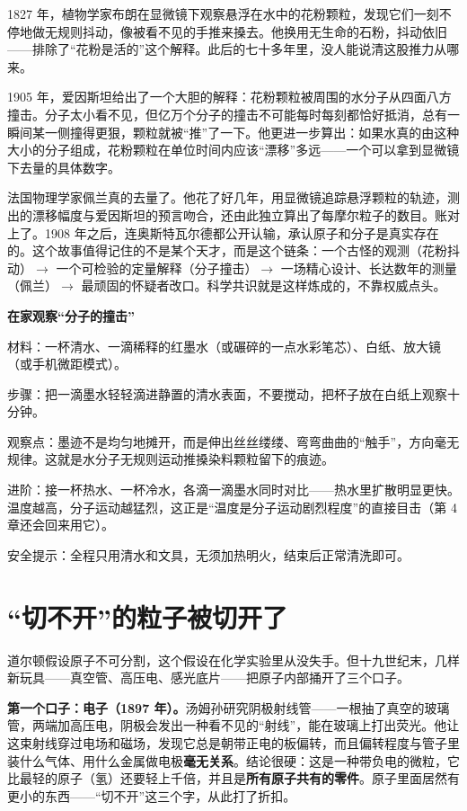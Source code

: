 \begin{zhengju}
1827 年，植物学家布朗在显微镜下观察悬浮在水中的花粉颗粒，发现它们一刻不停地做无规则抖动，像被看不见的手推来搡去。他换用无生命的石粉，抖动依旧——排除了“花粉是活的”这个解释。此后的七十多年里，没人能说清这股推力从哪来。

1905 年，爱因斯坦给出了一个大胆的解释：花粉颗粒被周围的水分子从四面八方撞击。分子太小看不见，但亿万个分子的撞击不可能每时每刻都恰好抵消，总有一瞬间某一侧撞得更狠，颗粒就被“推”了一下。他更进一步算出：如果水真的由这种大小的分子组成，花粉颗粒在单位时间内应该“漂移”多远——一个可以拿到显微镜下去量的具体数字。

法国物理学家佩兰真的去量了。他花了好几年，用显微镜追踪悬浮颗粒的轨迹，测出的漂移幅度与爱因斯坦的预言吻合，还由此独立算出了每摩尔粒子的数目。账对上了。1908 年之后，连奥斯特瓦尔德都公开认输，承认原子和分子是真实存在的。这个故事值得记住的不是某个天才，而是这个链条：一个古怪的观测（花粉抖动）$\rightarrow$ 一个可检验的定量解释（分子撞击）$\rightarrow$ 一场精心设计、长达数年的测量（佩兰）$\rightarrow$ 最顽固的怀疑者改口。科学共识就是这样炼成的，不靠权威点头。
\end{zhengju}

\begin{shiyan}
\textbf{在家观察“分子的撞击”}

材料：一杯清水、一滴稀释的红墨水（或碾碎的一点水彩笔芯）、白纸、放大镜（或手机微距模式）。

步骤：把一滴墨水轻轻滴进静置的清水表面，不要搅动，把杯子放在白纸上观察十分钟。

观察点：墨迹不是均匀地摊开，而是伸出丝丝缕缕、弯弯曲曲的“触手”，方向毫无规律。这就是水分子无规则运动推搡染料颗粒留下的痕迹。

进阶：接一杯热水、一杯冷水，各滴一滴墨水同时对比——热水里扩散明显更快。温度越高，分子运动越猛烈，这正是“温度是分子运动剧烈程度”的直接目击（第 4 章还会回来用它）。

安全提示：全程只用清水和文具，无须加热明火，结束后正常清洗即可。
\end{shiyan}

\section{“切不开”的粒子被切开了}

道尔顿假设原子不可分割，这个假设在化学实验里从没失手。但十九世纪末，几样新玩具——真空管、高压电、感光底片——把原子内部捅开了三个口子。

\textbf{第一个口子：电子（1897 年）。}汤姆孙研究阴极射线管——一根抽了真空的玻璃管，两端加高压电，阴极会发出一种看不见的“射线”，能在玻璃上打出荧光。他让这束射线穿过电场和磁场，发现它总是朝带正电的板偏转，而且偏转程度与管子里装什么气体、用什么金属做电极\textbf{毫无关系}。结论很硬：这是一种带负电的微粒，它比最轻的原子（氢）还要轻上千倍，并且是\textbf{所有原子共有的零件}。原子里面居然有更小的东西——“切不开”这三个字，从此打了折扣。


